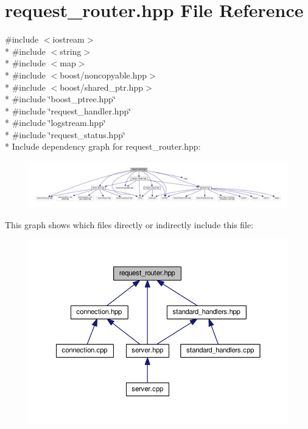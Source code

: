 \hypertarget{a00074}{\section{request\-\_\-router.\-hpp File Reference}
\label{a00074}
}
{\ttfamily \#include $<$iostream$>$}\\*
{\ttfamily \#include $<$string$>$}\\*
{\ttfamily \#include $<$map$>$}\\*
{\ttfamily \#include $<$boost/noncopyable.\-hpp$>$}\\*
{\ttfamily \#include $<$boost/shared\-\_\-ptr.\-hpp$>$}\\*
{\ttfamily \#include \char`\"{}boost\-\_\-ptree.\-hpp\char`\"{}}\\*
{\ttfamily \#include \char`\"{}request\-\_\-handler.\-hpp\char`\"{}}\\*
{\ttfamily \#include \char`\"{}logstream.\-hpp\char`\"{}}\\*
{\ttfamily \#include \char`\"{}request\-\_\-status.\-hpp\char`\"{}}\\*
Include dependency graph for request\-\_\-router.\-hpp\-:\nopagebreak
\begin{figure}[H]
\begin{center}
\leavevmode
\includegraphics[width=350pt]{a00118}
\end{center}
\end{figure}
This graph shows which files directly or indirectly include this file\-:\nopagebreak
\begin{figure}[H]
\begin{center}
\leavevmode
\includegraphics[width=350pt]{a00119}
\end{center}
\end{figure}
